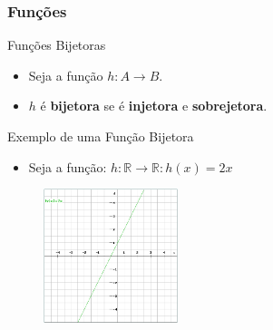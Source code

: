 \documentclass{beamer}
\begin{document}
\begin{frame}
\frametitle{Funções}

	\begin{block}{Funções Bijetoras}
		\begin{itemize}
			\item Seja a função $h: A \to B$.
			\item $h$ é \textbf{bijetora} se é \textbf{injetora} e \textbf{sobrejetora}.
		\end{itemize}
	\end{block}
	
	\begin{block}{Exemplo de uma Função Bijetora}
		\begin{itemize}
			\item Seja a função: $h: \mathbb{R} \to \mathbb{R} : h(x) = 2x$
		\end{itemize}
	\end{block}
	\begin{figure}[!h]
			\begin{center}
			\includegraphics[width=0.35\textwidth]{Figures/h}
			\end{center}
	\end{figure}	
	
\end{frame}


\end{document}
